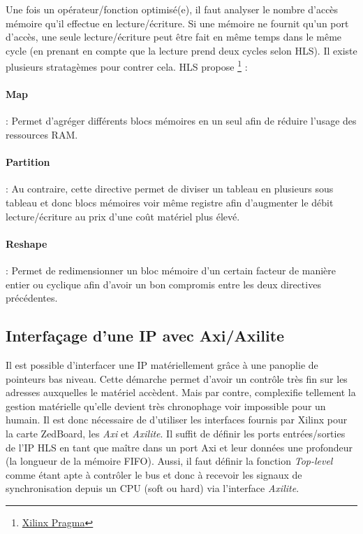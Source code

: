 \documentclass[12pt,a4paper]{article}
\begin{document}
Une fois un opérateur/fonction optimisé(e), il faut analyser le nombre d'accès mémoire qu'il effectue en lecture/écriture. Si une mémoire ne fournit qu'un port d'accès, une seule lecture/écriture peut être fait en même temps dans le même cycle (en prenant en compte que la lecture prend deux cycles selon HLS). Il existe plusieurs stratagèmes pour contrer cela. HLS propose \footnote{\href{https://japan.xilinx.com/html\_docs/xilinx2017\_4/sdaccel\_doc/okr1504034364623.html}{Xilinx Pragma}} :
\paragraph{Map} : Permet d'agréger différents blocs mémoires en un seul afin de réduire l'usage des ressources RAM.
\paragraph{Partition} : Au contraire, cette directive permet de diviser un tableau en plusieurs sous tableau et donc blocs mémoires voir même registre afin d'augmenter le débit lecture/écriture au prix d'une coût matériel plus élevé.
\paragraph{Reshape} : Permet de redimensionner un bloc mémoire d'un certain facteur de manière entier ou cyclique afin d'avoir un bon compromis entre les deux directives précédentes.

\subsection{Interfaçage d'une IP avec Axi/Axilite}
Il est possible d'interfacer une IP matériellement grâce à une panoplie de pointeurs bas niveau. Cette démarche permet d'avoir un contrôle très fin sur les adresses auxquelles le matériel accèdent. Mais par contre, complexifie tellement la gestion matérielle qu'elle devient très chronophage voir impossible pour un humain. Il est donc nécessaire de d'utiliser les interfaces fournis par Xilinx pour la carte ZedBoard, les \textit{Axi} et \textit{Axilite}. Il suffit de définir les ports entrées/sorties de l'IP HLS en tant que maître dans un port Axi et leur données une profondeur (la longueur de la mémoire FIFO). Aussi, il faut définir la fonction \textit{Top-level} comme étant apte à contrôler le bus et donc à recevoir les signaux de synchronisation depuis un CPU (soft ou hard) via l'interface \textit{Axilite}.
\end{document}
